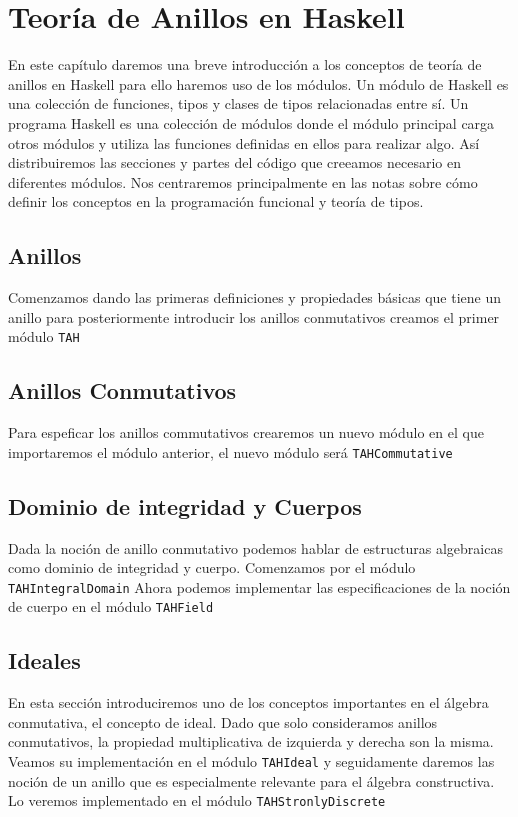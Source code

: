 \chapter{Teoría de Anillos en Haskell}
En este capítulo daremos una breve introducción a los conceptos de teoría de anillos en Haskell para ello haremos uso de los módulos. Un módulo de Haskell es una colección de funciones, tipos y clases de tipos relacionadas entre sí. Un programa Haskell es una colección de módulos donde el módulo principal carga otros módulos y utiliza las funciones definidas en ellos para realizar algo. Así distribuiremos las secciones y partes del código que creeamos necesario en diferentes módulos. Nos centraremos principalmente en las notas sobre cómo definir los conceptos en la programación funcional y teoría de tipos.

\section{Anillos}
Comenzamos dando las primeras definiciones y propiedades básicas que tiene un anillo para posteriormente introducir los anillos conmutativos creamos el primer módulo \texttt{TAH}

\section{Anillos Conmutativos}
Para espeficar los anillos commutativos crearemos un nuevo módulo en el que importaremos el módulo anterior, el nuevo módulo será \texttt{TAHCommutative}
\section{Dominio de integridad y Cuerpos}
Dada la noción de anillo conmutativo podemos hablar de estructuras algebraicas como dominio de integridad y cuerpo. Comenzamos por el módulo \texttt{TAHIntegralDomain} Ahora podemos implementar las especificaciones de la noción de cuerpo en el módulo \texttt{TAHField}

\section{Ideales}
En esta sección introduciremos uno de los conceptos importantes en el álgebra conmutativa, el concepto de ideal. Dado que solo consideramos anillos conmutativos, la propiedad multiplicativa de izquierda y derecha son la misma. Veamos su implementación en el módulo \texttt{TAHIdeal}
y seguidamente daremos las noción de un anillo que es especialmente relevante para el álgebra constructiva. Lo veremos implementado en el módulo \texttt{TAHStronlyDiscrete}

